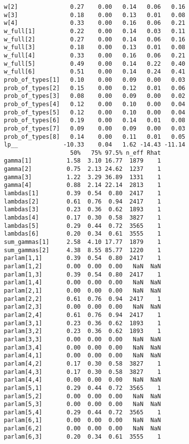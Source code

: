\documentclass[
  12pt,
]{book}
\begin{document}
\begin{verbatim}
w[2]               0.27    0.00   0.14   0.06   0.16
w[3]               0.18    0.00   0.13   0.01   0.08
w[4]               0.33    0.00   0.16   0.06   0.21
w_full[1]          0.22    0.00   0.14   0.03   0.11
w_full[2]          0.27    0.00   0.14   0.06   0.16
w_full[3]          0.18    0.00   0.13   0.01   0.08
w_full[4]          0.33    0.00   0.16   0.06   0.21
w_full[5]          0.49    0.00   0.14   0.22   0.40
w_full[6]          0.51    0.00   0.14   0.24   0.41
prob_of_types[1]   0.10    0.00   0.09   0.00   0.03
prob_of_types[2]   0.15    0.00   0.12   0.01   0.06
prob_of_types[3]   0.08    0.00   0.09   0.00   0.02
prob_of_types[4]   0.12    0.00   0.10   0.00   0.04
prob_of_types[5]   0.12    0.00   0.10   0.00   0.04
prob_of_types[6]   0.19    0.00   0.14   0.01   0.08
prob_of_types[7]   0.09    0.00   0.09   0.00   0.03
prob_of_types[8]   0.14    0.00   0.11   0.01   0.05
lp__             -10.33    0.04   1.62 -14.43 -11.14
                   50%   75% 97.5% n_eff Rhat
gamma[1]          1.58  3.10 16.77  1879    1
gamma[2]          0.75  2.13 24.62  1237    1
gamma[3]          1.22  3.29 36.89  1331    1
gamma[4]          0.88  2.14 22.14  2813    1
lambdas[1]        0.39  0.54  0.80  2417    1
lambdas[2]        0.61  0.76  0.94  2417    1
lambdas[3]        0.23  0.36  0.62  1893    1
lambdas[4]        0.17  0.30  0.58  3827    1
lambdas[5]        0.29  0.44  0.72  3565    1
lambdas[6]        0.20  0.34  0.61  3555    1
sum_gammas[1]     2.58  4.10 17.77  1879    1
sum_gammas[2]     4.38  8.55 85.77  1220    1
parlam[1,1]       0.39  0.54  0.80  2417    1
parlam[1,2]       0.00  0.00  0.00   NaN  NaN
parlam[1,3]       0.39  0.54  0.80  2417    1
parlam[1,4]       0.00  0.00  0.00   NaN  NaN
parlam[2,1]       0.00  0.00  0.00   NaN  NaN
parlam[2,2]       0.61  0.76  0.94  2417    1
parlam[2,3]       0.00  0.00  0.00   NaN  NaN
parlam[2,4]       0.61  0.76  0.94  2417    1
parlam[3,1]       0.23  0.36  0.62  1893    1
parlam[3,2]       0.23  0.36  0.62  1893    1
parlam[3,3]       0.00  0.00  0.00   NaN  NaN
parlam[3,4]       0.00  0.00  0.00   NaN  NaN
parlam[4,1]       0.00  0.00  0.00   NaN  NaN
parlam[4,2]       0.17  0.30  0.58  3827    1
parlam[4,3]       0.17  0.30  0.58  3827    1
parlam[4,4]       0.00  0.00  0.00   NaN  NaN
parlam[5,1]       0.29  0.44  0.72  3565    1
parlam[5,2]       0.00  0.00  0.00   NaN  NaN
parlam[5,3]       0.00  0.00  0.00   NaN  NaN
parlam[5,4]       0.29  0.44  0.72  3565    1
parlam[6,1]       0.00  0.00  0.00   NaN  NaN
parlam[6,2]       0.00  0.00  0.00   NaN  NaN
parlam[6,3]       0.20  0.34  0.61  3555    1

\end{verbatim}
\end{document}
